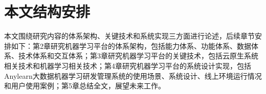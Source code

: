 %
\section{本文结构安排}

本文围绕研究内容的体系架构、关键技术和系统实现三方面进行论述，后续章节安排如下：第2章研究机器学习平台的体系架构，包括能力体系、功能体系、数据体系、技术体系和交互体系；第3章研究机器学习平台的关键技术，包括云原生系统相关技术和机器学习相关技术；第4章研究机器学习平台的系统设计实现，包括Anylearn大数据机器学习研发管理系统的使用场景、系统设计、线上环境运行情况和用户使用案例；第5章总结全文，展望未来工作。  
